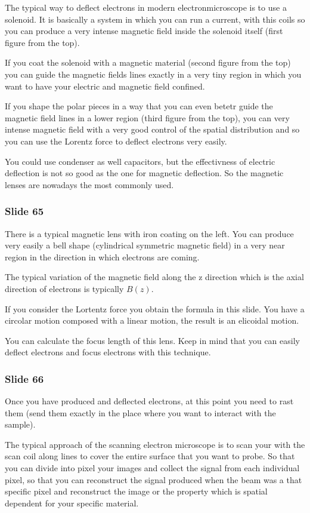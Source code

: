 \documentclass[../main/main.tex]{subfiles}
\begin{document}
The typical way to deflect electrons in modern electronmicroscope is to use a solenoid. It is basically a system in which you can run a current, with this coils so you can produce a very intense magnetic field inside the solenoid itself (first figure from the top).

If you coat the solenoid with a magnetic material (second figure from the top) you can guide the magnetic fields lines exactly in a very tiny region in which you want to have your electric and magnetic field confined.

If you shape the polar pieces in a way that you can even betetr guide the magnetic field lines in a lower region (third figure from the top), you can very intense magnetic field with a very good control of the spatial distribution and so you can use the Lorentz force to deflect electrons very easily.

You could use condenser as well capacitors, but the effectivness of electric deflection is not so good as the one for magnetic deflection. So the magnetic lenses are nowadays the most commonly used.

\subsubsection{Slide 65}
There is a typical magnetic lens with iron coating on the left. You can produce very easily a bell shape (cylindrical symmetric magnetic field) in a very near region in the direction in which electrons are coming.

The typical variation of the magnetic field along the z direction which is the axial direction of electrons is typically \( B(z) \).

If you consider the Lortentz force you obtain the formula in this slide. You have a circolar motion composed with a linear motion, the result is an elicoidal motion.

You can calculate the focus length of this lens. Keep in mind that you can easily deflect electrons and focus electrons with this technique.

\subsubsection{Slide 66}

Once you have produced and deflected electrons, at this point you need to rast them (send them exactly in the place where you want to interact with the sample).

The typical approach of the scanning electron microscope is to scan your with the scan coil along lines to cover the entire surface that you want to probe. So that you can divide into pixel your images and collect the signal from each individual pixel, so that you can reconstruct the signal produced when the beam was a that specific pixel and reconstruct the image or the property which is spatial dependent for your specific material.
\end{document}
